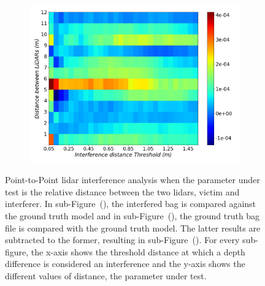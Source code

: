 \begin{figure}[!ht]
\begin{subfigure}[c]{0.45\textwidth}
	\label{fig:distance:ground-truth-color-mesh}
\end{subfigure}
\\ \vspace{4mm}
\begin{subfigure}[c]{0.6\textwidth}
	\includegraphics[width=\textwidth]{img/lidar-interference/distance/difference_ground_truth_interference_measurement.png}
\caption{}%
	\label{fig:distance:difference-color-mesh}
\end{subfigure}

\caption[Point-to-Point analysis when the distance between \acp{lidar} is variated.]{Point-to-Point \ac{lidar} interference analysis when the parameter under test is the relative distance between the two \acp{lidar}, victim and interferer. In sub-Figure~(), the interfered bag is compared against the ground truth model and in sub-Figure~(), the ground truth bag file is compared with the ground truth model. The latter results are subtracted to the former, resulting in sub-Figure~(). For every sub-figure, the x-axis shows the threshold distance at which a depth difference is considered an interference and the y-axis shows the different values of distance, the parameter under test.}
\label{fig:distance:color-mesh}
\end{figure}

